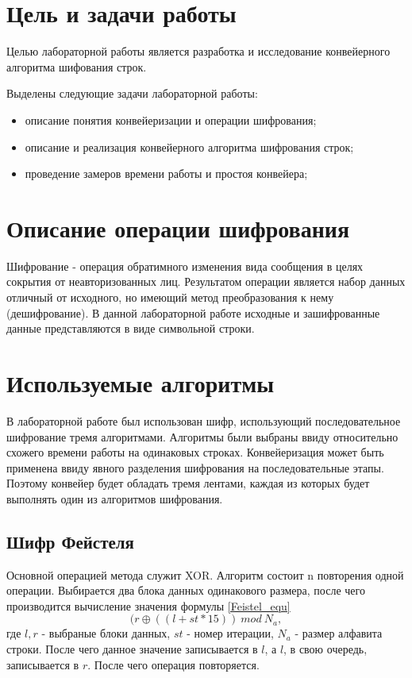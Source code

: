 \section{Цель и задачи работы}
Целью лабораторной работы является разработка и исследование конвейерного алгоритма шифования строк.

Выделены следующие задачи лабораторной работы:

\begin{itemize}
\item описание понятия конвейеризации и операции шифрования;
\item описание и реализация конвейерного алгоритма шифрования строк;
\item проведение замеров времени работы и простоя конвейера;
\end{itemize}

\section{Описание операции шифрования}
Шифрование - операция обратимного изменения вида сообщения в целях сокрытия от неавторизованных лиц. Результатом операции является набор данных отличный от исходного, но имеющий метод преобразования к нему (дешифрование). В данной лабораторной работе исходные и зашифрованные данные представляются в виде символьной строки.

\section{Используемые алгоритмы}
В лабораторной работе был использован шифр, использующий последовательное шифрование тремя алгоритмами\cite{kripto}. Алгоритмы были выбраны ввиду относительно схожего времени работы на одинаковых строках. Конвейеризация может быть применена ввиду явного разделения шифрования на последовательные этапы. Поэтому конвейер будет обладать тремя лентами, каждая из которых будет выполнять один из алгоритмов шифрования.

\subsection{Шифр Фейстеля}
	Основной операцией метода служит XOR. Алгоритм состоит n повторения одной операции. Выбирается два блока данных одинакового размера, после чего производится вычисление значения формулы \ref{Feistel_equ}
	\begin{equation}\label{Feistel_equ}
		(r \oplus ((l + st * 15))\:mod\:N_a,
	\end{equation}
	где 
	$l, r$ - выбраные блоки данных, 
	$st$ - номер итерации, 
	$N_a$ - размер алфавита строки.
	После чего данное значение записывается в $l$, а $l$, в свою очередь, записывается в $r$. После чего операция повторяется.
	

